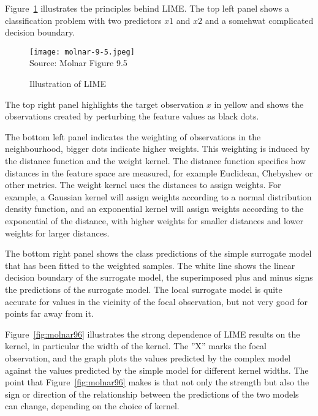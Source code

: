 Figure~\ref{fig:molnar95} illustrates the principles behind LIME. The top left panel shows a classification problem with two predictors $x1$ and $x2$ and a somehwat complicated decision boundary. 

\begin{figure}
\centering
\texttt{[image: molnar-9-5.jpeg]} \\

\scriptsize Source: Molnar Figure 9.5
\caption{Illustration of LIME}
\label{fig:molnar95}
\end{figure}

The top right panel highlights the target observation $x$ in yellow and shows the observations created by perturbing the feature values as black dots. 

The bottom left panel indicates the weighting of observations in the neighbourhood, bigger dots indicate higher weights. This weighting is induced by the distance function and the weight kernel. The distance function specifies how distances in the feature space are measured, for example Euclidean, Chebyshev or other metrics. The weight kernel uses the distances to assign weights. For example, a Gaussian kernel will assign weights according to a normal distribution density function, and an exponential kernel will assign weights according to the exponential of the distance, with higher weights for smaller distances and lower weights for larger distances. 

The bottom right panel shows the class predictions of the simple surrogate model that has been fitted to the weighted samples. The white line shows the linear decision boundary of the surrogate model, the superimposed plus and minus signs the predictions of the surrogate model. The local surrogate model is quite accurate for values in the vicinity of the focal observation, but not very good for points far away from it.

Figure~\ref{fig:molnar96} illustrates the strong dependence of LIME results on the kernel, in particular the width of the kernel. The ''X'' marks the focal observation, and the graph plots the values predicted by the complex model against the values predicted by the simple model for different kernel widths. The point that Figure~\ref{fig:molnar96} makes is that not only the strength but also the sign or direction of the relationship between the predictions of the two models can change, depending on the choice of kernel. 

